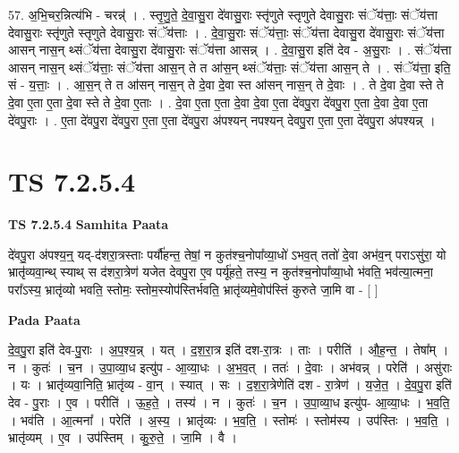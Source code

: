 \documentclass[17pt]{extarticle}
\begin{document}
57. अ॒भि॒चर॒न्नित्य॑भि - चरन्न्॑ । . स्तृ॒णु॒ते॒ दे॒वा॒सु॒रा दे॑वासु॒राः स्तृ॑णुते स्तृणुते देवासु॒राः संॅय॑त्ताः॒ संॅय॑त्ता देवासु॒राः स्तृ॑णुते स्तृणुते देवासु॒राः संॅय॑त्ताः । . दे॒वा॒सु॒राः संॅय॑त्ताः॒ संॅय॑त्ता देवासु॒रा दे॑वासु॒राः संॅय॑त्ता आसन् नास॒न् थ्संॅय॑त्ता देवासु॒रा दे॑वासु॒राः संॅय॑त्ता आसन्न् । . दे॒वा॒सु॒रा इति॑ देव - अ॒सु॒राः । . संॅय॑त्ता आसन् नास॒न् थ्संॅय॑त्ताः॒ संॅय॑त्ता आस॒न् ते त आ॑स॒न् थ्संॅय॑त्ताः॒ संॅय॑त्ता आस॒न् ते । . संॅय॑त्ता॒ इति॒ सं - य॒त्ताः॒ । . आ॒स॒न् ते त आ॑सन् नास॒न् ते दे॒वा दे॒वा स्त आ॑सन् नास॒न् ते दे॒वाः । . ते दे॒वा दे॒वा स्ते ते दे॒वा ए॒ता ए॒ता दे॒वा स्ते ते दे॒वा ए॒ताः । . दे॒वा ए॒ता ए॒ता दे॒वा दे॒वा ए॒ता दे॑वपु॒रा दे॑वपु॒रा ए॒ता दे॒वा दे॒वा ए॒ता दे॑वपु॒राः । . ए॒ता दे॑वपु॒रा दे॑वपु॒रा ए॒ता ए॒ता दे॑वपु॒रा अ॑पश्यन् नपश्यन् देवपु॒रा ए॒ता ए॒ता दे॑वपु॒रा अ॑पश्यन्न् । \newline
\pagebreak
{}

\section{ TS 7.2.5.4 }

\textbf{TS 7.2.5.4 } \newline
\textbf{Samhita Paata} \newline

दे॑वपु॒रा अ॑पश्य॒न्॒ यद्-द॑शरा॒त्रस्ताः पर्यौ॑हन्त॒ तेषां॒ न कुत॑श्च॒नोपा᳚व्या॒धो॑ ऽभव॒त् ततो॑ दे॒वा अभ॑व॒न् पराऽसु॑रा॒ यो भ्रातृ॑व्यवा॒न्थ् स्याथ् स द॑शरा॒त्रेण॑ यजेत देवपु॒रा ए॒व पर्यू॑हते॒ तस्य॒ न कुत॑श्च॒नोपा᳚व्या॒धो भ॑वति॒ भव॑त्या॒त्मना॒ परा᳚ऽस्य॒ भ्रातृ॑व्यो भवति॒ स्तोमः॒ स्तोम॒स्योप॑स्तिर्भवति॒ भ्रातृ॑व्यमे॒वोप॑स्तिं कुरुते जा॒मि वा - [  ] \newline

\textbf{Pada Paata} \newline

दे॒व॒पु॒रा इति॑ देव-पु॒राः । अ॒प॒श्य॒न्न् । यत् । द॒श॒रा॒त्र इति॑ दश-रा॒त्रः । ताः । परीति॑ । औ॒ह॒न्त॒ । तेषा᳚म् । न । कुतः॑ । च॒न । उ॒पा॒व्या॒ध इत्यु॑प - आ॒व्या॒धः । अ॒भ॒व॒त् । ततः॑ । दे॒वाः । अभ॑वन्न् । परेति॑ । असु॑राः । यः । भ्रातृ॑व्यवा॒निति॒ भ्रातृ॑व्य - वा॒न् । स्यात् । सः । द॒श॒रा॒त्रेणेति॑ दश - रा॒त्रेण॑ । य॒जे॒त॒ । दे॒व॒पु॒रा इति॑ देव - पु॒राः । ए॒व । परीति॑ । ऊ॒ह॒ते॒ । तस्य॑ । न । कुतः॑ । च॒न । उ॒पा॒व्या॒ध इत्यु॑प- आ॒व्या॒धः । भ॒व॒ति॒ । भव॑ति । आ॒त्मना᳚ । परेति॑ । अ॒स्य॒ । भ्रातृ॑व्यः । भ॒व॒ति॒ । स्तोमः॑ । स्तोम॑स्य । उप॑स्तिः । भ॒व॒ति॒ । भ्रातृ॑व्यम् । ए॒व । उप॑स्तिम् । कु॒रु॒ते॒ । जा॒मि । वै ।  \newline
\end{document}
